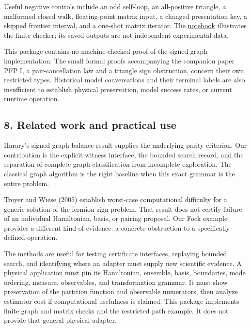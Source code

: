 \documentclass[
  11pt,
]{article}
\begin{document}
Useful negative controls include an odd self-loop, an all-positive
triangle, a malformed closed walk, floating-point matrix input, a
changed presentation key, a skipped frontier interval, and a one-shot
matrix iterator. The
\href{https://github.com/dbccpage/the_symbol_game/blob/main/omega_engine_education/documentation/030_pfp_proposal_fidelity_protocol_pfp/papers/omega_engine_symbol_game/002_pfp_signed_presentations_and_search_frontier/jupyter_notebooks/signed_exchange_and_frontier.ipynb}{notebook}
illustrates the finite checker; its saved outputs are not independent
experimental data.

This package contains no machine-checked proof of the signed-graph
implementation. The small formal proofs accompanying the companion paper
PFP I, a pair-cancellation law and a triangle sign obstruction, concern
their own restricted types. Historical model conversations and their
terminal labels are also insufficient to establish physical
preservation, model success rates, or current runtime operation.

\hypertarget{related-work-and-practical-use}{%
\subsection{8. Related work and practical
use}\label{related-work-and-practical-use}}

Harary's signed-graph balance result supplies the underlying parity
criterion. Our contribution is the explicit witness interface, the
bounded search record, and the separation of complete graph
classification from incomplete exploration. The classical graph
algorithm is the right baseline when this exact grammar is the entire
problem.

Troyer and Wiese (2005) establish worst-case computational difficulty
for a generic solution of the fermion sign problem. That result does not
certify failure of an individual Hamiltonian, basis, or pairing
proposal. Our Fock example provides a different kind of evidence: a
concrete obstruction to a specifically defined operation.

The methods are useful for testing certificate interfaces, replaying
bounded search, and identifying where an adapter must supply new
scientific evidence. A physical application must pin its Hamiltonian,
ensemble, basis, boundaries, mode ordering, measure, observables, and
transformation grammar. It must show preservation of the partition
function and observable numerators, then analyze estimator cost if
computational usefulness is claimed. This package implements finite
graph and matrix checks and the restricted path example. It does not
provide that general physical adapter.
\end{document}
